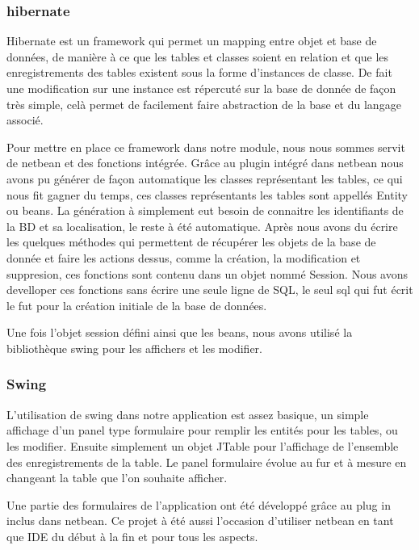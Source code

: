 \documentclass[11pt,a4paper]{article}
\begin{document}
\subsubsection{hibernate}

Hibernate est un framework qui permet un mapping entre objet et base de données, de manière à ce que les tables et classes soient en relation et que les enregistrements des tables existent sous la forme d'instances de classe. De fait une modification sur une instance est répercuté sur la base de donnée de façon très simple, celà permet de facilement faire abstraction de la base et du langage associé.

Pour mettre en place ce framework dans notre module, nous nous sommes servit de netbean et des fonctions intégrée. Grâce au plugin intégré dans netbean nous avons pu générer de façon automatique les classes représentant les tables, ce qui nous fit gagner du temps, ces classes représentants les tables sont appellés Entity ou beans. La génération à simplement eut besoin de connaitre les identifiants de la BD et sa localisation, le reste à été automatique. Après nous avons du écrire les quelques méthodes qui permettent de récupérer les objets de la base de donnée et faire les actions dessus, comme la création, la modification et suppresion, ces fonctions sont contenu dans un objet nommé Session. Nous avons develloper ces fonctions sans écrire une seule ligne de SQL, le seul sql qui fut écrit le fut pour la création initiale de la base de données.

Une fois l'objet session défini ainsi que les beans, nous avons utilisé la bibliothèque swing pour les affichers et les modifier.

\subsubsection{Swing}

L'utilisation de swing dans notre application est assez basique, un simple affichage d'un panel type formulaire pour remplir les entités pour les tables, ou les modifier. Ensuite simplement un objet JTable pour l'affichage de l'ensemble des enregistrements de la table. Le panel formulaire évolue au fur et à mesure en changeant la table que l'on souhaite afficher. 

Une partie des formulaires de l'application ont été développé grâce au plug in inclus dans netbean. Ce projet à été aussi l'occasion d'utiliser netbean en tant que IDE du début à la fin et pour tous les aspects.
\end{document}
